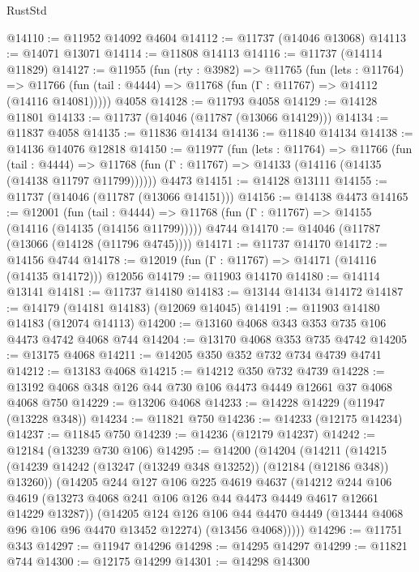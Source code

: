 \begin{lexlean}{RustStd}
\begin{coremodule}
@14110 := @11952 @14092 @4604
@14112 := @11737 (@14046 @13068)
@14113 := @14071 @13071
@14114 := @11808 @14113
@14116 := @11737 (@14114 @11829)
@14127 := @11955
    (fun (rty : @3982) =>
    @11765
      (fun (lets : @11764) =>
      @11766 (fun (tail : @4444) => @11768 (fun (Γ : @11767) => @14112 (@14116 @14081)))))
    @4058
@14128 := @11793 @4058
@14129 := @14128 @11801
@14133 := @11737 (@14046 (@11787 (@13066 @14129)))
@14134 := @11837 @4058
@14135 := @11836 @14134
@14136 := @11840 @14134
@14138 := @14136 @14076 @12818
@14150 := @11977
    (fun (lets : @11764) =>
    @11766
      (fun (tail : @4444) =>
      @11768 (fun (Γ : @11767) => @14133 (@14116 (@14135 (@14138 @11797 @11799))))))
    @4473
@14151 := @14128 @13111
@14155 := @11737 (@14046 (@11787 (@13066 @14151)))
@14156 := @14138 @4473
@14165 := @12001
    (fun (tail : @4444) => @11768 (fun (Γ : @11767) => @14155 (@14116 (@14135 (@14156 @11799)))))
    @4744
@14170 := @14046 (@11787 (@13066 (@14128 (@11796 @4745))))
@14171 := @11737 @14170
@14172 := @14156 @4744
@14178 := @12019 (fun (Γ : @11767) => @14171 (@14116 (@14135 @14172))) @12056
@14179 := @11903 @14170
@14180 := @14114 @13141
@14181 := @11737 @14180
@14183 := @13144 @14134 @14172
@14187 := @14179 (@14181 @14183) (@12069 @14045)
@14191 := @11903 @14180 @14183 (@12074 @14113)
@14200 := @13160 @4068 @343 @353 @735 @106 @4473 @4742 @4068 @744
@14204 := @13170 @4068 @353 @735 @4742
@14205 := @13175 @4068
@14211 := @14205 @350 @352 @732 @734 @4739 @4741
@14212 := @13183 @4068
@14215 := @14212 @350 @732 @4739
@14228 := @13192 @4068 @348 @126 @44 @730 @106 @4473 @4449 @12661 @37 @4068 @4068 @750
@14229 := @13206 @4068
@14233 := @14228 @14229 (@11947 (@13228 @348))
@14234 := @11821 @750
@14236 := @14233 (@12175 @14234)
@14237 := @11845 @750
@14239 := @14236 (@12179 @14237)
@14242 := @12184 (@13239 @730 @106)
@14295 := @14200
    (@14204
      (@14211
        (@14215 (@14239 @14242 (@13247 (@13249 @348 @13252)) (@12184 (@12186 @348)) @13260))
        (@14205
          @244
          @127
          @106
          @225
          @4619
          @4637
          (@14212
            @244
            @106
            @4619
            (@13273 @4068 @241 @106 @126 @44 @4473 @4449 @4617 @12661 @14229 @13287))
          (@14205
            @124
            @126
            @106
            @44
            @4470
            @4449
            (@13444 @4068 @96 @106 @96 @4470 @13452 @12274)
            (@13456 @4068)))))
@14296 := @11751 @343
@14297 := @11947 @14296
@14298 := @14295 @14297
@14299 := @11821 @744
@14300 := @12175 @14299
@14301 := @14298 @14300

\end{coremodule}
\end{lexlean}
